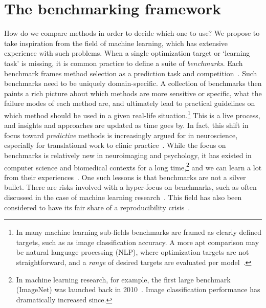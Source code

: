 \clearpage
\section{The benchmarking framework}
\label{sec:benchmark-framework}

How do we compare methods in order to decide which one to use?
We propose to take inspiration from the field of machine learning, which has extensive experience with such problems.
%
When a single optimization target or `learning task' is missing, it is common practice to define a suite of \emph{benchmarks}.
Each benchmark frames method selection as a prediction task and competition~\parencite{Breiman2001, Shmueli2010, Bzdok2018, Khosla2019, Poldrack2020, Tejavibulya2022}.
Such benchmarks need to be uniquely domain-specific.
A collection of benchmarks then paints a rich picture about which methods are more sensitive or specific, what the failure modes of each method are, and ultimately lead to practical guidelines on which method should be used in a given real-life situation.\footnote{In many machine learning sub-fields benchmarks are framed as clearly defined targets, such as as image classification accuracy. A more apt comparison may be natural language processing (NLP), where optimization targets are not straightforward, and a \emph{range} of desired targets are evaluated per model~\parencite[see e.g.][]{Bommasani2021}.}
This is a live process, and insights and approaches are updated as time goes by.
%
In fact, this shift in focus toward \emph{predictive} methods is increasingly argued for in neuroscience, especially for translational work to clinic practice~\parencite{Yarkoni2017, Leenings2022, Voytek2022}.
While the focus on benchmarks is relatively new in neuroimaging and psychology, it has existed in computer science and biomedical contexts for a long time,\footnote{In machine learning research, for example, the first large benchmark (ImageNet) was launched back in 2010~\parencite{Deng2009}. Image classification performance has dramatically increased since.} and we can learn a lot from their experiences~\parencite{Leenings2022}.
%
One such lessons is that benchmarks are not a silver bullet.
There are risks involved with a hyper-focus on benchmarks, such as often discussed in the case of machine learning research~\parencite{Wagstaff2012, Sculley2018}.
This field has also been considered to have its fair share of a reproducibility crisis~\parencite[see also][]{Bell2021}.

